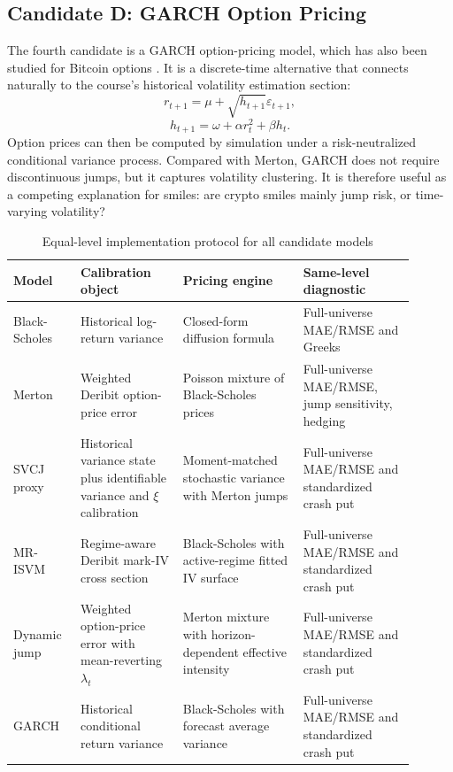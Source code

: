 \documentclass[11pt]{article}
\begin{document}
\subsection{Candidate D: GARCH Option Pricing}

The fourth candidate is a GARCH option-pricing model, which has also been studied for Bitcoin options \cite{venter2020garch}. It is a discrete-time alternative that connects naturally to the course's historical volatility estimation section:
\[
r_{t+1}=\mu+\sqrt{h_{t+1}}\varepsilon_{t+1},
\]
\[
h_{t+1}=\omega+\alpha r_t^2+\beta h_t.
\]
Option prices can then be computed by simulation under a risk-neutralized conditional variance process. Compared with Merton, GARCH does not require discontinuous jumps, but it captures volatility clustering. It is therefore useful as a competing explanation for smiles: are crypto smiles mainly jump risk, or time-varying volatility?

\begin{table}[H]
\centering
\caption{Equal-level implementation protocol for all candidate models}
\small
\begin{tabular}{p{0.15\linewidth}p{0.23\linewidth}p{0.27\linewidth}p{0.25\linewidth}}
\toprule
Model & Calibration object & Pricing engine & Same-level diagnostic\\
\midrule
Black-Scholes & Historical log-return variance & Closed-form diffusion formula & Full-universe MAE/RMSE and Greeks\\
Merton & Weighted Deribit option-price error & Poisson mixture of Black-Scholes prices & Full-universe MAE/RMSE, jump sensitivity, hedging\\
SVCJ proxy & Historical variance state plus identifiable variance and $\xi$ calibration & Moment-matched stochastic variance with Merton jumps & Full-universe MAE/RMSE and standardized crash put\\
MR-ISVM & Regime-aware Deribit mark-IV cross section & Black-Scholes with active-regime fitted IV surface & Full-universe MAE/RMSE and standardized crash put\\
Dynamic jump & Weighted option-price error with mean-reverting $\lambda_t$ & Merton mixture with horizon-dependent effective intensity & Full-universe MAE/RMSE and standardized crash put\\
GARCH & Historical conditional return variance & Black-Scholes with forecast average variance & Full-universe MAE/RMSE and standardized crash put\\
\bottomrule
\end{tabular}
\end{table}
\end{document}
